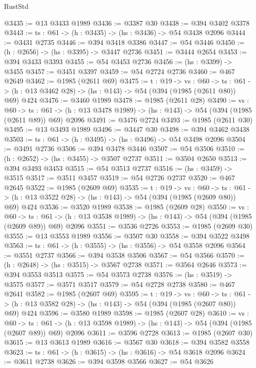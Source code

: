 \begin{lexlean}{RustStd}
\begin{coremodule}
{\begin{coremodule}
{{{{{{{{{{@3435 := @13 @3433 @1989
@3436 := @3387 @30
@3438 := @394 @3402 @3378
@3443 := {ts : @61} -> (h : @3435) -> (hs : @3436) -> @54 @3438 @2096
@3444 := @3431 @2735
@3446 := @394 @3418 @3386
@3447 := @54 @3446
@3450 := (h : @2656) -> (hs : @3395) -> @3447 @2736
@3451 := @3444 @2654
@3453 := @394 @3433 @3393
@3455 := @54 @3453 @2736
@3456 := (hs : @3399) -> @3455
@3457 := @3451 @3397
@3459 := @54 @2724 @2736
@3460 := @467 @2649
@3462 := @1985 (@2611 @69)
@3475 := {t : @19} ->
  {vs : @60} ->
  {ts : @61} -> (h : @13 @3462 @28) -> (hs : @143) -> @54 (@394 (@1985 (@2611 @80)) @69) @424
@3476 := @3460 @1989
@3478 := @1985 (@2611 @28)
@3490 := {vs : @60} ->
  {ts : @61} -> (h : @13 @3478 @1989) -> (hs : @143) -> @54 (@394 (@1985 (@2611 @89)) @69) @2096
@3491 := @3476 @2724
@3493 := @1985 (@2611 @30)
@3495 := @13 @3493 @1989
@3496 := @3447 @30
@3498 := @394 @3462 @3438
@3503 := {ts : @61} -> (h : @3495) -> (hs : @3496) -> @54 @3498 @2096
@3504 := @3491 @2736
@3506 := @394 @3478 @3446
@3507 := @54 @3506
@3510 := (h : @2652) -> (hs : @3455) -> @3507 @2737
@3511 := @3504 @2650
@3513 := @394 @3493 @3453
@3515 := @54 @3513 @2737
@3516 := (hs : @3459) -> @3515
@3517 := @3511 @3457
@3519 := @54 @2726 @2737
@3520 := @467 @2645
@3522 := @1985 (@2609 @69)
@3535 := {t : @19} ->
  {vs : @60} ->
  {ts : @61} -> (h : @13 @3522 @28) -> (hs : @143) -> @54 (@394 (@1985 (@2609 @80)) @69) @424
@3536 := @3520 @1989
@3538 := @1985 (@2609 @28)
@3550 := {vs : @60} ->
  {ts : @61} -> (h : @13 @3538 @1989) -> (hs : @143) -> @54 (@394 (@1985 (@2609 @89)) @69) @2096
@3551 := @3536 @2726
@3553 := @1985 (@2609 @30)
@3555 := @13 @3553 @1989
@3556 := @3507 @30
@3558 := @394 @3522 @3498
@3563 := {ts : @61} -> (h : @3555) -> (hs : @3556) -> @54 @3558 @2096
@3564 := @3551 @2737
@3566 := @394 @3538 @3506
@3567 := @54 @3566
@3570 := (h : @2648) -> (hs : @3515) -> @3567 @2738
@3571 := @3564 @2646
@3573 := @394 @3553 @3513
@3575 := @54 @3573 @2738
@3576 := (hs : @3519) -> @3575
@3577 := @3571 @3517
@3579 := @54 @2728 @2738
@3580 := @467 @2641
@3582 := @1985 (@2607 @69)
@3595 := {t : @19} ->
  {vs : @60} ->
  {ts : @61} -> (h : @13 @3582 @28) -> (hs : @143) -> @54 (@394 (@1985 (@2607 @80)) @69) @424
@3596 := @3580 @1989
@3598 := @1985 (@2607 @28)
@3610 := {vs : @60} ->
  {ts : @61} -> (h : @13 @3598 @1989) -> (hs : @143) -> @54 (@394 (@1985 (@2607 @89)) @69) @2096
@3611 := @3596 @2728
@3613 := @1985 (@2607 @30)
@3615 := @13 @3613 @1989
@3616 := @3567 @30
@3618 := @394 @3582 @3558
@3623 := {ts : @61} -> (h : @3615) -> (hs : @3616) -> @54 @3618 @2096
@3624 := @3611 @2738
@3626 := @394 @3598 @3566
@3627 := @54 @3626
}}}}}}}}}}
\end{coremodule}}
\end{coremodule}
\end{lexlean}

